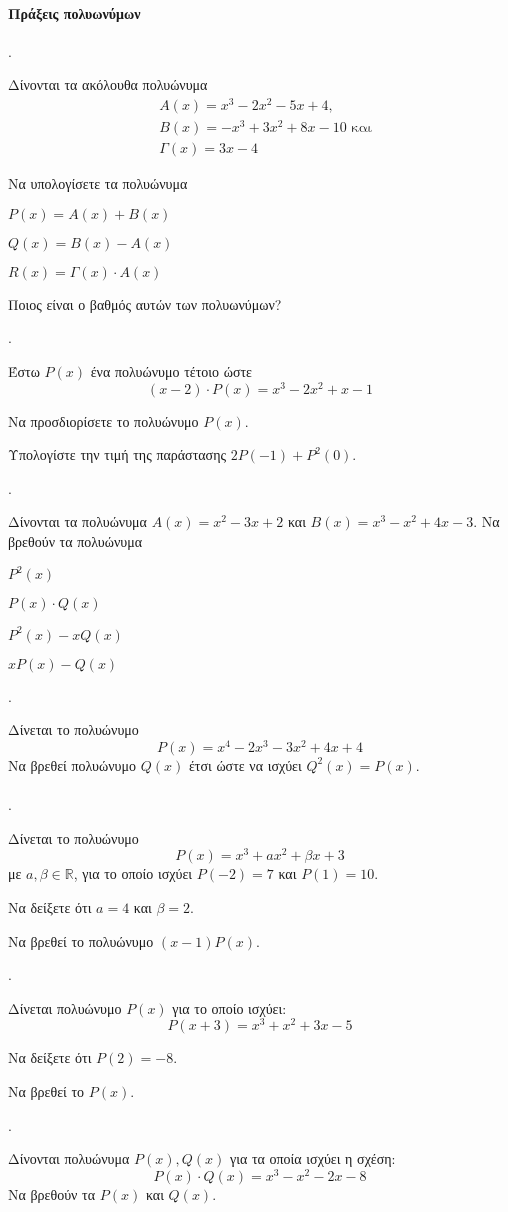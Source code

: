 \documentclass[11pt,a4paper,twocolumn]{article}
\newcounter{askhsh}
\newcommand{\askhsh}{\large\theaskhsh.\ \addtocounter{askhsh}{1}}
\begin{document}
\paragraph{Πράξεις πολυωνύμων}
\askhsh Δίνονται τα ακόλουθα πολυώνυμα 
\begin{align*}
&A(x)=x^3-2x^2-5x+4,\\&B(x)=-x^3+3x^2+8x-10 \text{ και} \\&\varGamma(x)=3x-4
\end{align*}
\begin{alist}
\item Να υπολογίσετε τα πολυώνυμα
\begin{rlist}
\item $P(x)=A(x)+B(x)$
\item $Q(x)=B(x)-A(x)$
\item $R(x)=\varGamma(x)\cdot A(x)$
\end{rlist}
\item Ποιος είναι ο βαθμός αυτών των πολυωνύμων?
\end{alist}
\askhsh Έστω $P(x)$ ένα πολυώνυμο τέτοιο ώστε 
\[ (x-2)\cdot P(x)=x^3-2x^2+x-1 \]
\begin{alist}
\item Να προσδιορίσετε το πολυώνυμο $P(x)$.
\item Υπολογίστε την τιμή της παράστασης $2P(-1)+P^2(0)$.
\end{alist}
\askhsh Δίνονται τα πολυώνυμα $A(x)=x^2-3x+2$ και $B(x)=x^3-x^2+4x-3$.
Να βρεθούν τα πολυώνυμα
\begin{multicols}{2}
\begin{alist}
\item $P^2(x)$
\item $P(x)\cdot Q(x)$
\item $P^2(x)-xQ(x)$
\item $xP(x)-Q(x)$
\end{alist}
\end{multicols}
\askhsh Δίνεται το πολυώνυμο \[ P(x)=x^4-2x^3-3x^2+4x+4 \] Να βρεθεί πολυώνυμο $ Q(x) $ έτσι ώστε να ισχύει $ Q^2(x)=P(x) $.\\\\
\askhsh Δίνεται το πολυώνυμο \[P(x)=x^3+ax^2+\beta x+3\]
με $a,\beta\in\mathbb{R}$, για το οποίο ισχύει $P(-2)=7$ και $P(1)=10$.
\begin{alist}
\item Να δείξετε ότι $a=4$ και $\beta=2$.
\item Να βρεθεί το πολυώνυμο $ (x-1)P(x) $.
\end{alist}
\askhsh Δίνεται πολυώνυμο $P(x)$ για το οποίο ισχύει:
\[ P(x+3)=x^3+x^2+3x-5 \]
\begin{alist}
\item Να δείξετε ότι $P(2)=-8$.
\item Να βρεθεί το $P(x)$.
\end{alist}
\askhsh Δίνονται πολυώνυμα $P(x),Q(x)$ για τα οποία ισχύει η σχέση:
\[ P(x)\cdot Q(x)=x^3-x^2-2x-8 \]
Να βρεθούν τα $P(x)$ και $Q(x)$.
\end{document}
